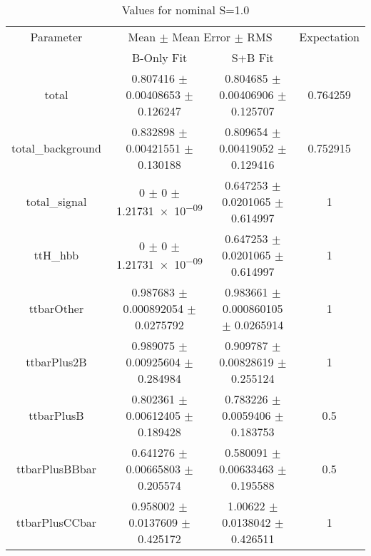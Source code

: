 \begin{table}
\centering
\caption{Values for nominal S=1.0}
\begin{tabular}{cccc}
\toprule
Parameter & \multicolumn{2}{c}{Mean $\pm$ Mean Error $\pm$ RMS} & Expectation\\
 & B-Only Fit & S+B Fit & \\
\midrule
total & \num{0.807416} $\pm$ \num{0.00408653} $\pm$ \num{0.126247} & \num{0.804685} $\pm$ \num{0.00406906} $\pm$ \num{0.125707} & \num{0.764259}\\
total\_background & \num{0.832898} $\pm$ \num{0.00421551} $\pm$ \num{0.130188} & \num{0.809654} $\pm$ \num{0.00419052} $\pm$ \num{0.129416} & \num{0.752915}\\
total\_signal & \num{0} $\pm$ \num{0} $\pm$ \num{1.21731e-09} & \num{0.647253} $\pm$ \num{0.0201065} $\pm$ \num{0.614997} & \num{1}\\
ttH\_hbb & \num{0} $\pm$ \num{0} $\pm$ \num{1.21731e-09} & \num{0.647253} $\pm$ \num{0.0201065} $\pm$ \num{0.614997} & \num{1}\\
ttbarOther & \num{0.987683} $\pm$ \num{0.000892054} $\pm$ \num{0.0275792} & \num{0.983661} $\pm$ \num{0.000860105} $\pm$ \num{0.0265914} & \num{1}\\
ttbarPlus2B & \num{0.989075} $\pm$ \num{0.00925604} $\pm$ \num{0.284984} & \num{0.909787} $\pm$ \num{0.00828619} $\pm$ \num{0.255124} & \num{1}\\
ttbarPlusB & \num{0.802361} $\pm$ \num{0.00612405} $\pm$ \num{0.189428} & \num{0.783226} $\pm$ \num{0.0059406} $\pm$ \num{0.183753} & \num{0.5}\\
ttbarPlusBBbar & \num{0.641276} $\pm$ \num{0.00665803} $\pm$ \num{0.205574} & \num{0.580091} $\pm$ \num{0.00633463} $\pm$ \num{0.195588} & \num{0.5}\\
ttbarPlusCCbar & \num{0.958002} $\pm$ \num{0.0137609} $\pm$ \num{0.425172} & \num{1.00622} $\pm$ \num{0.0138042} $\pm$ \num{0.426511} & \num{1}\\
\bottomrule
\end{tabular}
\end{table}